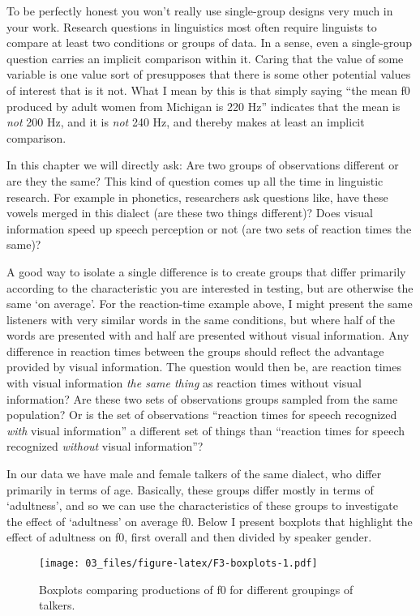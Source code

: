 \documentclass[
]{book}
\begin{document}
To be perfectly honest you won't really use single-group designs very much in your work. Research questions in linguistics most often require linguists to compare at least two conditions or groups of data. In a sense, even a single-group question carries an implicit comparison within it. Caring that the value of some variable is one value sort of presupposes that there is some other potential values of interest that is it not. What I mean by this is that simply saying ``the mean f0 produced by adult women from Michigan is 220 Hz'' indicates that the mean is \emph{not} 200 Hz, and it is \emph{not} 240 Hz, and thereby makes at least an implicit comparison.

In this chapter we will directly ask: Are two groups of observations different or are they the same? This kind of question comes up all the time in linguistic research. For example in phonetics, researchers ask questions like, have these vowels merged in this dialect (are these two things different)? Does visual information speed up speech perception or not (are two sets of reaction times the same)?

A good way to isolate a single difference is to create groups that differ primarily according to the characteristic you are interested in testing, but are otherwise the same `on average'. For the reaction-time example above, I might present the same listeners with very similar words in the same conditions, but where half of the words are presented with and half are presented without visual information. Any difference in reaction times between the groups should reflect the advantage provided by visual information. The question would then be, are reaction times with visual information \emph{the same thing} as reaction times without visual information? Are these two sets of observations groups sampled from the same population? Or is the set of observations ``reaction times for speech recognized \emph{with} visual information'' a different set of things than ``reaction times for speech recognized \emph{without} visual information''?

In our data we have male and female talkers of the same dialect, who differ primarily in terms of age. Basically, these groups differ mostly in terms of `adultness', and so we can use the characteristics of these groups to investigate the effect of `adultness' on average f0. Below I present boxplots that highlight the effect of adultness on f0, first overall and then divided by speaker gender.

\begin{figure}
\centering
\texttt{[image: 03\_files/figure-latex/F3-boxplots-1.pdf]}
\caption{\label{fig:F3-boxplots}Boxplots comparing productions of f0 for different groupings of talkers.}
\end{figure}
\end{document}
